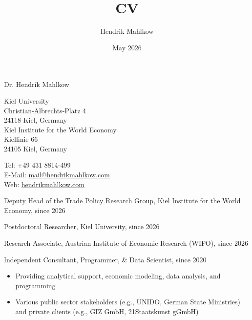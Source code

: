 \documentclass{article}
\title{CV}
\author{Hendrik Mahlkow}
\date{May 2026}
\newlength{\cvlabelwidth}\setlength{\cvlabelwidth}{0.12\textwidth}
\newlength{\cvlabelgap}\setlength{\cvlabelgap}{5mm}
\newcommand{\cvmakelabel}[1]{%
    \smash{\parbox[t]{\cvlabelwidth}{\raggedright{\fontfamily{phv}\selectfont #1}}}}
\newenvironment{cvsection}[1]{%
    \par\medskip
    \begin{list}{}{%
        \setlength{\leftmargin}{\dimexpr\cvlabelwidth+\cvlabelgap\relax}%
        \setlength{\labelwidth}{\cvlabelwidth}%
        \setlength{\labelsep}{\cvlabelgap}%
        \setlength{\rightmargin}{0pt}%
        \setlength{\itemindent}{0pt}%
        \setlength{\listparindent}{0pt}%
        \setlength{\topsep}{0pt}%
        \setlength{\partopsep}{0pt}%
        \setlength{\parsep}{0.3em}%
        \setlength{\itemsep}{0pt}%
        \let\makelabel\cvmakelabel%
    }%
    \item[#1]\ignorespaces%
}{%
    \end{list}\medskip%
}
\begin{document}
{\selectfont 
	    \LARGE{Dr. Hendrik Mahlkow}
	}\\
\bigskip


\begin{minipage}[t]{0.66\textwidth}
    Kiel University \\
    Christian-Albrechts-Platz 4\\
    24118 Kiel, Germany \\
    \newline
    Kiel Institute for the World Economy \\
    Kiellinie 66 \\
    24105 Kiel, Germany
\end{minipage}
\hfill
\begin{minipage}[t]{0.33\textwidth} 
    Tel: +49 431 8814-499 \\
    E-Mail: \href{mailto:mail@hendrikmahlkow.com}{mail@hendrikmahlkow.com} \\
    Web: \href{http://hendrikmahlkow.com}{hendrikmahlkow.com} 
\end{minipage}
\bigskip
\bigskip

\begin{cvsection}{CURRENT POSITIONS}
    Deputy Head of the Trade Policy Research Group, Kiel Institute for the World Economy, since 2026 \par
    Postdoctoral Researcher, Kiel University, since 2026 \par
    Research Associate, Austrian Institute of Economic Research (WIFO), since 2026 \par
    Independent Consultant, Programmer, \& Data Scientist, since 2020 \par
    \begin{itemize}
        \item[-] Providing analytical support, economic modeling, data analysis, and programming
        \item[-] Various public sector stakeholders (e.g., UNIDO, German State Ministries) and private clients (e.g., GIZ GmbH, 21Staatskunst gGmbH)
    \end{itemize}
\end{cvsection}
\end{document}
